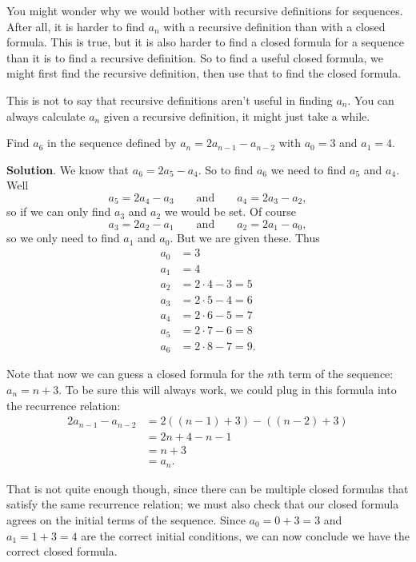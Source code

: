 \documentclass[11pt,]{book}
\theoremstyle{ptxplainnotitle}
\theoremstyle{ptxplaintitle}
\theoremstyle{ptxdefinitionnotitle}
\theoremstyle{ptxdefinitiontitle}
\theoremstyle{ptxdefinitionnotitle}
\theoremstyle{ptxdefinitiontitle}
\theoremstyle{ptxdefinitionnotitle}
\theoremstyle{ptxdefinitiontitle}
\theoremstyle{ptxdefinitiontitlenonumber}
\theoremstyle{ptxdefinitiontitlenonumber}
\numberwithin{equation}{chapter}
\newcommand{\amp}{&}
\begin{document}
\hypertarget{p-51}{}%
You might wonder why we would bother with recursive definitions for sequences. After all, it is harder to find \(a_n\) with a recursive definition than with a closed formula. This is true, but it is also harder to find a closed formula for a sequence than it is to find a recursive definition. So to find a useful closed formula, we might first find the recursive definition, then use that to find the closed formula.%
\par
\hypertarget{p-52}{}%
This is not to say that recursive definitions aren't useful in finding \(a_n\). You can always calculate \(a_n\) given a recursive definition, it might just take a while.%
\begin{example}\label{example-3}
\hypertarget{p-53}{}%
Find \(a_6\) in the sequence defined by \(a_n = 2a_{n-1} - a_{n-2}\) with \(a_0 = 3\) and \(a_1 = 4\).%
\par\smallskip%
\noindent\textbf{Solution}.\hypertarget{solution-2}{}\quad%
\hypertarget{p-54}{}%
We know that \(a_6 = 2a_5 - a_4\). So to find \(a_6\) we need to find \(a_5\) and \(a_4\). Well%
\begin{equation*}
a_5 = 2a_4 - a_3 \qquad \text{and} \qquad a_4 = 2a_3 - a_2,
\end{equation*}
so if we can only find \(a_3\) and \(a_2\) we would be set. Of course%
\begin{equation*}
a_3 = 2a_2 - a_1 \qquad \text{and} \qquad a_2 = 2a_1 - a_0,
\end{equation*}
so we only need to find \(a_1\) and \(a_0\). But we are given these. Thus%
\begin{align*}
a_0 \amp = 3\\
a_1 \amp = 4\\
a_2 \amp = 2\cdot 4 - 3 = 5\\
a_3 \amp = 2\cdot 5 - 4 = 6\\
a_4 \amp = 2\cdot 6 - 5 = 7\\
a_5 \amp = 2\cdot 7 - 6 = 8\\
a_6 \amp = 2\cdot 8 - 7 = 9.
\end{align*}
%
\par
\hypertarget{p-55}{}%
Note that now we can guess a closed formula for the \(n\)th term of the sequence: \(a_n = n+3\). To be sure this will always work, we could plug in this formula into the recurrence relation:%
\begin{align*}
2a_{n-1} - a_{n-2} \amp = 2((n-1) + 3) - ((n-2) + 3)\\
\amp = 2n + 4 - n - 1 \\
\amp = n + 3\\
\amp = a_n.
\end{align*}
%
\par
\hypertarget{p-56}{}%
That is not quite enough though, since there can be multiple closed formulas that satisfy the same recurrence relation; we must also check that our closed formula agrees on the initial terms of the sequence.  Since \(a_0 = 0 + 3 = 3\) and \(a_1 = 1+3 = 4\) are the correct initial conditions, we can now conclude we have the correct closed formula.%
\end{example}
\end{document}
